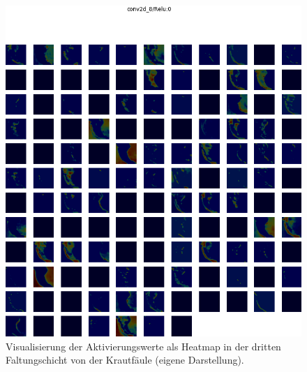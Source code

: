 \begin{figure}[h!]
	\centering
	\includegraphics[width=\textwidth]{visualisierungen/late/heatmap_mit/conv2d_8.png}
	\caption{Visualisierung der Aktivierungswerte als Heatmap in der dritten Faltungschicht von der Krautfäule (eigene Darstellung).}
	\label{late6_heat_vis}
\end{figure}

